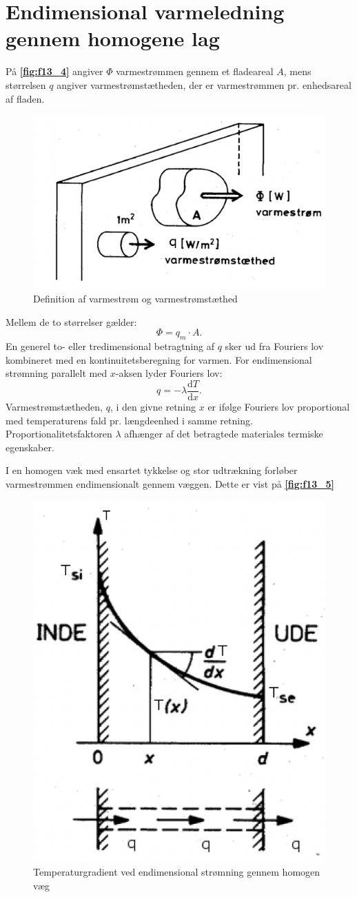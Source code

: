 \section{Endimensional varmeledning gennem homogene lag}
På \textbf{\autoref{fig:f13_4}} angiver $\Phi$ varmestrømmen gennem et fladeareal $A$, mens størrelsen $q$ angiver varmestrømstætheden, der er varmestrømmen pr. enhedsareal af fladen. 
\begin{figure} [ht]
  \centering
  \includegraphics[width=0.5\linewidth]{./figures/f13_4.png}
  \caption{Definition af varmestrøm og varmestrømstæthed}
  \label{fig:f13_4}
\end{figure}

Mellem de to størrelser gælder:
\[ 
\Phi = q_m \cdot A
.\]
En generel to- eller tredimensional betragtning af $q$ sker ud fra Fouriers lov kombineret med en kontinuitetsberegning for varmen. For endimensional strømning parallelt med $x$-aksen lyder Fouriers lov:
\[ 
q = -\lambda \frac{\mathrm{d}T}{\mathrm{d}x} 
.\]
Varmestrømstætheden, $q$, i den givne retning $x$ er ifølge Fouriers lov proportional med temperaturens fald pr. længdeenhed i samme retning. Proportionalitetsfaktoren $\lambda$ afhænger af det betragtede materiales termiske egenskaber.

I en homogen væk med ensartet tykkelse og stor udtrækning forløber varmestrømmen endimensionalt gennem væggen. Dette er vist på \textbf{\autoref{fig:f13_5}}
\begin{figure} [ht]
  \centering
  \includegraphics[width=0.5\linewidth]{./figures/f13_5.png}
  \caption{Temperaturgradient ved endimensional strømning gennem homogen væg}
  \label{fig:f13_5}
\end{figure}


